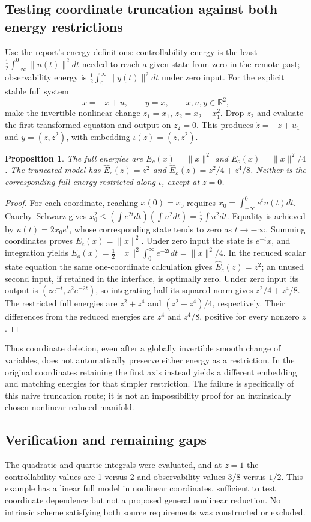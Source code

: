 \documentclass[11pt]{article}
\newtheorem{proposition}{Proposition}
\begin{document}
\subsection{Testing coordinate truncation against both energy restrictions}
Use the report's energy definitions: controllability energy is the least $\frac12\int_{-\infty}^0\|u(t)\|^2dt$ needed to reach a given state from zero in the remote past; observability energy is $\frac12\int_0^\infty\|y(t)\|^2dt$ under zero input. For the explicit stable full system
\[
\dot x=-x+u,\qquad y=x,\qquad x,u,y\in\mathbb R^2,
\]
make the invertible nonlinear change $z_1=x_1$, $z_2=x_2-x_1^2$. Drop $z_2$ and evaluate the first transformed equation and output on $z_2=0$. This produces $\dot z=-z+u_1$ and $y=(z,z^2)$, with embedding $\iota(z)=(z,z^2)$.
\begin{proposition}
The full energies are $E_c(x)=\|x\|^2$ and $E_o(x)=\|x\|^2/4$. The truncated model has $\widehat E_c(z)=z^2$ and $\widehat E_o(z)=z^2/4+z^4/8$. Neither is the corresponding full energy restricted along $\iota$, except at $z=0$.
\end{proposition}
\begin{proof}
For each coordinate, reaching $x(0)=x_0$ requires $x_0=\int_{-\infty}^0 e^t u(t)dt$. Cauchy--Schwarz gives $x_0^2\le(\int e^{2t}dt)(\int u^2dt)=\frac12\int u^2dt$. Equality is achieved by $u(t)=2x_0e^t$, whose corresponding state tends to zero as $t\to-\infty$. Summing coordinates proves $E_c(x)=\|x\|^2$. Under zero input the state is $e^{-t}x$, and integration yields $E_o(x)=\frac12\|x\|^2\int_0^\infty e^{-2t}dt=\|x\|^2/4$.
In the reduced scalar state equation the same one-coordinate calculation gives $\widehat E_c(z)=z^2$; an unused second input, if retained in the interface, is optimally zero. Under zero input its output is $(ze^{-t},z^2e^{-2t})$, so integrating half its squared norm gives $z^2/4+z^4/8$. The restricted full energies are $z^2+z^4$ and $(z^2+z^4)/4$, respectively. Their differences from the reduced energies are $z^4$ and $z^4/8$, positive for every nonzero $z$.
\end{proof}
Thus coordinate deletion, even after a globally invertible smooth change of variables, does not automatically preserve either energy as a restriction. In the original coordinates retaining the first axis instead yields a different embedding and matching energies for that simpler restriction. The failure is specifically of this naive truncation route; it is not an impossibility proof for an intrinsically chosen nonlinear reduced manifold.
\subsection{Verification and remaining gaps}
The quadratic and quartic integrals were evaluated, and at $z=1$ the controllability values are 1 versus 2 and observability values $3/8$ versus $1/2$. This example has a linear full model in nonlinear coordinates, sufficient to test coordinate dependence but not a proposed general nonlinear reduction. No intrinsic scheme satisfying both source requirements was constructed or excluded.
\end{document}
